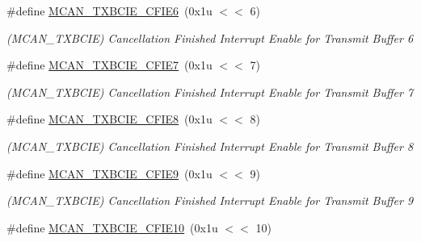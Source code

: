 \begin{DoxyCompactItemize}
\mbox{\label{group__SAMV71__MCAN_gafca783e2f4c4237da31fdbf82e28c6f5}} 
\#define \mbox{\hyperlink{group__SAMV71__MCAN_gafca783e2f4c4237da31fdbf82e28c6f5}{M\+C\+A\+N\+\_\+\+T\+X\+B\+C\+I\+E\+\_\+\+C\+F\+I\+E6}}~(0x1u $<$$<$ 6)
\begin{DoxyCompactList}\small\item\em (M\+C\+A\+N\+\_\+\+T\+X\+B\+C\+IE) Cancellation Finished Interrupt Enable for Transmit Buffer 6 \end{DoxyCompactList}\item 
\mbox{\label{group__SAMV71__MCAN_ga505c5bf1d5d19a73e26732d54025e7a1}} 
\#define \mbox{\hyperlink{group__SAMV71__MCAN_ga505c5bf1d5d19a73e26732d54025e7a1}{M\+C\+A\+N\+\_\+\+T\+X\+B\+C\+I\+E\+\_\+\+C\+F\+I\+E7}}~(0x1u $<$$<$ 7)
\begin{DoxyCompactList}\small\item\em (M\+C\+A\+N\+\_\+\+T\+X\+B\+C\+IE) Cancellation Finished Interrupt Enable for Transmit Buffer 7 \end{DoxyCompactList}\item 
\mbox{\label{group__SAMV71__MCAN_gaeef531b63a4d633777612ab12f39b227}} 
\#define \mbox{\hyperlink{group__SAMV71__MCAN_gaeef531b63a4d633777612ab12f39b227}{M\+C\+A\+N\+\_\+\+T\+X\+B\+C\+I\+E\+\_\+\+C\+F\+I\+E8}}~(0x1u $<$$<$ 8)
\begin{DoxyCompactList}\small\item\em (M\+C\+A\+N\+\_\+\+T\+X\+B\+C\+IE) Cancellation Finished Interrupt Enable for Transmit Buffer 8 \end{DoxyCompactList}\item 
\mbox{\label{group__SAMV71__MCAN_gad43b05a5d7c2ce76523b1be2468d2294}} 
\#define \mbox{\hyperlink{group__SAMV71__MCAN_gad43b05a5d7c2ce76523b1be2468d2294}{M\+C\+A\+N\+\_\+\+T\+X\+B\+C\+I\+E\+\_\+\+C\+F\+I\+E9}}~(0x1u $<$$<$ 9)
\begin{DoxyCompactList}\small\item\em (M\+C\+A\+N\+\_\+\+T\+X\+B\+C\+IE) Cancellation Finished Interrupt Enable for Transmit Buffer 9 \end{DoxyCompactList}\item 
\mbox{\label{group__SAMV71__MCAN_gab246f0983fa0dc6c301d4182f3659c23}} 
\#define \mbox{\hyperlink{group__SAMV71__MCAN_gab246f0983fa0dc6c301d4182f3659c23}{M\+C\+A\+N\+\_\+\+T\+X\+B\+C\+I\+E\+\_\+\+C\+F\+I\+E10}}~(0x1u $<$$<$ 10)
$$
\end{DoxyCompactItemize}
